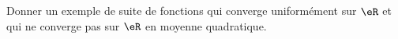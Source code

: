 

\begin{exercice}\label{exo_I-4-2}

Donner un exemple de suite de fonctions qui converge uniformément sur $\eR$ et qui ne converge pas sur $\eR$ en moyenne quadratique.

\end{exercice}
